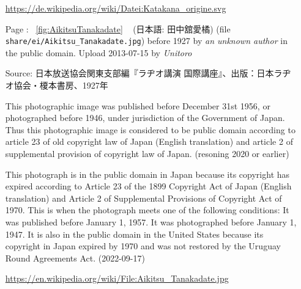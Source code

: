 \begin{itemize}
            \url{https://de.wikipedia.org/wiki/Datei:Katakana_origine.svg}

    \item[Page \pageref{fig:AikitsuTanakadate}:] ~\ref{fig:AikitsuTanakadate}
            ~ (日本語: 田中舘愛橘) (file
            \texttt{share/ei/Aikitsu\_Tanakadate.jpg}) before 1927 by
            \textit{an unknown author} in the public domain.  Upload 2013-07-15
            by \textit{Unitoro}

            Source: 日本放送協会関東支部編『ラヂオ講演 国際講座』、出版：日本ラヂオ協会・榎本書房、1927年

            This photographic image was published before December 31st 1956, or
            photographed before 1946, under jurisdiction of the Government of
            Japan. Thus this photographic image is considered to be public
            domain according to article 23 of old copyright law of Japan
            (English translation) and article 2 of supplemental provision of
            copyright law of Japan. (resoning 2020 or earlier)

            This photograph is in the public domain in Japan because its
            copyright has expired according to Article 23 of the 1899 Copyright
            Act of Japan (English translation) and Article 2 of Supplemental
            Provisions of Copyright Act of 1970. This is when the photograph
            meets one of the following conditions: It was published before
            January 1, 1957.  It was photographed before January 1, 1947.  It
            is also in the public domain in the United States because its
            copyright in Japan expired by 1970 and was not restored by the
            Uruguay Round Agreements Act. (2022-09-17)

            \url{https://en.wikipedia.org/wiki/File:Aikitsu_Tanakadate.jpg}

\end{itemize}




